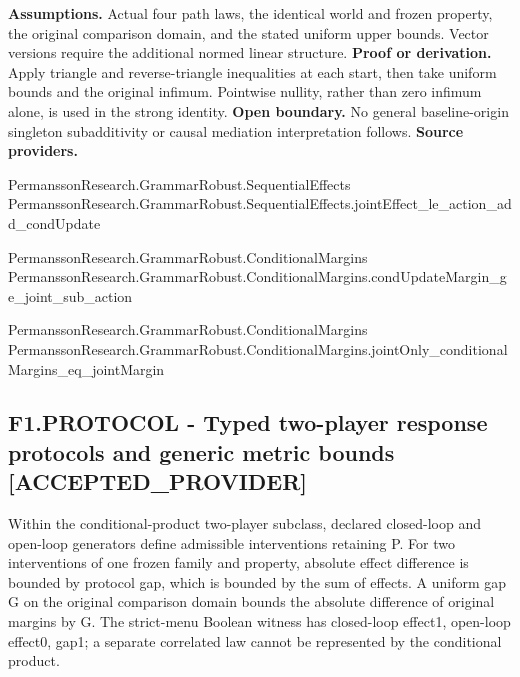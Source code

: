 \documentclass[11pt,a4paper]{article}
\begin{document}
\textbf{Assumptions.} Actual four path laws, the identical world and frozen property, the original comparison domain, and the stated uniform upper bounds. Vector versions require the additional normed linear structure.
\textbf{Proof or derivation.} Apply triangle and reverse-triangle inequalities at each start, then take uniform bounds and the original infimum. Pointwise nullity, rather than zero infimum alone, is used in the strong identity.
\textbf{Open boundary.} No general baseline-origin singleton subadditivity or causal mediation interpretation follows.
\textbf{Source providers.}
{\footnotesize\raggedright PermanssonRe\allowbreak{}search.Gramm\allowbreak{}arRobust.Seq\allowbreak{}uentialEffec\allowbreak{}ts\\ PermanssonRe\allowbreak{}search.Gramm\allowbreak{}arRobust.Seq\allowbreak{}uentialEffec\allowbreak{}ts.jointEffe\allowbreak{}ct\_le\_action\allowbreak{}\_add\_condUpd\allowbreak{}ate\par}
{\footnotesize\raggedright PermanssonRe\allowbreak{}search.Gramm\allowbreak{}arRobust.Con\allowbreak{}ditionalMarg\allowbreak{}ins\\ PermanssonRe\allowbreak{}search.Gramm\allowbreak{}arRobust.Con\allowbreak{}ditionalMarg\allowbreak{}ins.condUpda\allowbreak{}teMargin\_ge\_\allowbreak{}joint\_sub\_ac\allowbreak{}tion\par}
{\footnotesize\raggedright PermanssonRe\allowbreak{}search.Gramm\allowbreak{}arRobust.Con\allowbreak{}ditionalMarg\allowbreak{}ins\\ PermanssonRe\allowbreak{}search.Gramm\allowbreak{}arRobust.Con\allowbreak{}ditionalMarg\allowbreak{}ins.jointOnl\allowbreak{}y\_conditiona\allowbreak{}lMargins\_eq\_\allowbreak{}jointMargin\par}
\subsection*{F1.PROTOCOL - Typed two-player response protocols and generic metric bounds [ACCEPTED\_PROVIDER]}
Within the conditional-product two-player subclass, declared closed-loop and open-loop generators define admissible interventions retaining P. For two interventions of one frozen family and property, absolute effect difference is bounded by protocol gap, which is bounded by the sum of effects. A uniform gap G on the original comparison domain bounds the absolute difference of original margins by G. The strict-menu Boolean witness has closed-loop effect1, open-loop effect0, gap1; a separate correlated law cannot be represented by the conditional product.
\end{document}

